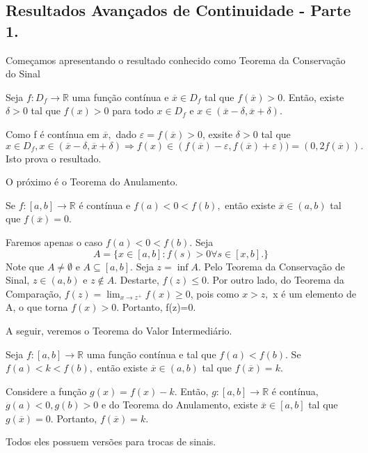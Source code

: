 \documentclass[analysis_notes.tex]{subfiles}
\begin{document}
\subsection{Resultados Avan\c cados de Continuidade - Parte 1.}
Come\c camos apresentando o resultado conhecido como Teorema da Conserva\c c\~ao do Sinal
\begin{theorem*}
	Seja $f:D_{f}\rightarrow \mathbb{R}$ uma fun\c c\~ao cont\'inua e $\overline{x}\in D_{f}$ tal que $f(\overline{x})>0.$
	Ent\~ao, existe $\delta>0$ tal que $f(x)>0$ para todo $x\in D_{f}$ e $x\in(\overline{x}-\delta, \overline{x}+\delta).$
\end{theorem*}
\begin{proof*}
	Como f \'e cont\'inua em $\overline{x},$ dado $\varepsilon = f(\overline{x}) >0$, exsite $\delta > 0$ tal que
	$$
		x\in D_{f}, x\in(\overline{x}-\delta, \overline{x}+\delta) \Rightarrow f(x)\in (f(\overline{x})-\varepsilon, f(\overline{x})+\varepsilon)) =
		(0, 2f(\overline{x})).
	$$
	Isto prova o resultado. \qedsymbol
\end{proof*}
O pr\'oximo \'e o Teorema do Anulamento.
\begin{theorem*}
	Se $f:[a,b]\rightarrow \mathbb{R}$ \'e cont\'inua e $f(a)<0<f(b),$ ent\~ao existe $\overline{x}\in(a, b)$ tal que $f(\overline{x}) =0.$
\end{theorem*}
\begin{proof*}
	Faremos apenas o caso $f(a)<0<f(b).$ Seja
	$$
		A = \{x\in[a,b]:f(s)>0 \forall s\in[x, b].\}
	$$
	Note que $A\neq\emptyset$ e $A\subseteq{[a, b]}.$ Seja $z =\inf{A}$. Pelo Teorema da Conserva\c c\~ao de Sinal,
	$z\in(a, b)$ e $z\not\in A.$ Destarte, $f(z)\leq{0}.$ Por outro lado, do Teorema da Compara\c c\~ao, $f(z)=
		\lim_{x\to z^{+}}f(x)\geq{0}$, pois como $x > z,$ x \'e um elemento de A, o que torna $f(x)>0$. Portanto, f(z)=0.
\end{proof*}
A seguir, veremos o Teorema do Valor Intermedi\'ario.
\begin{theorem*}
	Seja $f:[a, b]\rightarrow \mathbb{R}$ uma fun\c c\~ao cont\'inua e tal que  $f(a)<f(b)$. Se $f(a)<k<f(b),$
	ent\~ao existe $\overline{x}\in(a, b)$ tal que $f(\overline{x})=k.$
\end{theorem*}
\begin{proof*}
	Considere a fun\c c\~ao $g(x)=f(x)-k.$ Ent\~ao, $g:[a, b]\rightarrow \mathbb{R}$ \'e cont\'inua, $g(a)<0, g(b)>0$
	e do Teorema do Anulamento, existe $\overline{x}\in[a, b]$ tal que $g(\overline{x})=0.$ Portanto, $f(\overline{x})=k.$\qedsymbol
\end{proof*}
Todos eles possuem vers\~oes para trocas de sinais.
\end{document}
